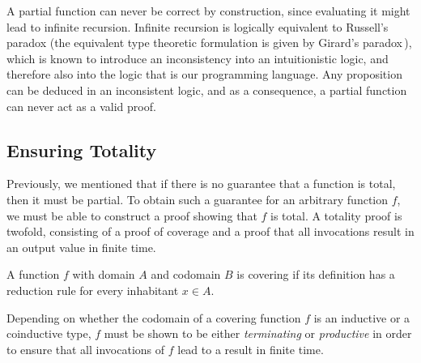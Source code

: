 A partial function can never be correct by construction, since evaluating it
might lead to infinite recursion. Infinite recursion is logically equivalent to
Russell's paradox (the equivalent type theoretic formulation is given by
Girard's paradox\,\citep{Girard1972}), which is known to introduce an inconsistency into an
intuitionistic logic, and therefore also into the logic that is our programming
language. Any proposition can be deduced in an inconsistent logic, and as a
consequence, a partial function can never act as a valid proof.


\subsection{Ensuring Totality}
Previously, we mentioned that if there is no guarantee that a function is total,
then it must be partial. To obtain such a guarantee for an arbitrary function
$f$, we must be able to construct a proof showing that $f$ is total. A totality
proof is twofold, consisting of a proof of coverage and a proof that all
invocations result in an output value in finite time.

\begin{definition}
  \label{def:covering_function}
  A function $f$ with domain $A$ and codomain $B$ is covering if its definition
  has a reduction rule for every inhabitant $x\in A$.
\end{definition}

Depending on whether the codomain of a covering function $f$ is an inductive or
a coinductive type, $f$ must be shown to be either \emph{terminating} or
\emph{productive} in order to ensure that all invocations of $f$ lead to a
result in finite time.

